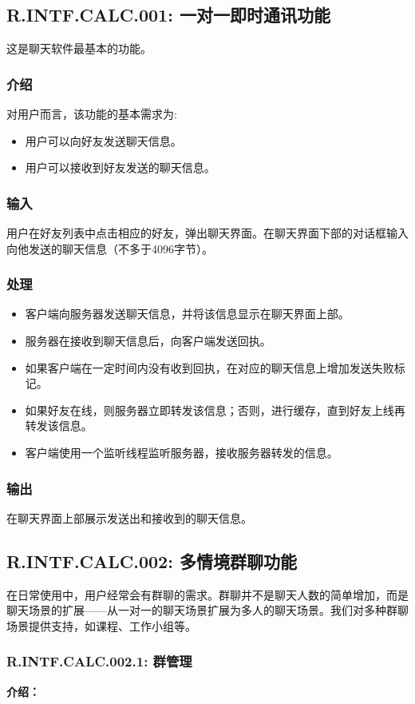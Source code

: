 \subsection{R.INTF.CALC.001: 一对一即时通讯功能}
这是聊天软件最基本的功能。
\subsubsection{介绍}
对用户而言，该功能的基本需求为:
\begin{itemize}
  \item 用户可以向好友发送聊天信息。
  \item 用户可以接收到好友发送的聊天信息。
\end{itemize}
\subsubsection{输入}
用户在好友列表中点击相应的好友，弹出聊天界面。在聊天界面下部的对话框输入向他发送的聊天信息（不多于4096字节）。
\subsubsection{处理}
\begin{itemize}
  \item 客户端向服务器发送聊天信息，并将该信息显示在聊天界面上部。
  \item 服务器在接收到聊天信息后，向客户端发送回执。
  \item 如果客户端在一定时间内没有收到回执，在对应的聊天信息上增加发送失败标记。
  \item 如果好友在线，则服务器立即转发该信息；否则，进行缓存，直到好友上线再转发该信息。
  \item 客户端使用一个监听线程监听服务器，接收服务器转发的信息。
\end{itemize}
\subsubsection{输出}
在聊天界面上部展示发送出和接收到的聊天信息。


\subsection{\color{red}R.INTF.CALC.002: 多情境群聊功能}
在日常使用中，用户经常会有群聊的需求。群聊并不是聊天人数的简单增加，而是聊天场景的扩展——从一对一的聊天场景扩展为多人的聊天场景。我们对多种群聊场景提供支持，如课程、工作小组等。

\subsubsection{R.INTF.CALC.002.1: 群管理}
\textbf{介绍：}

